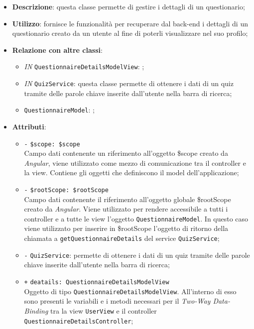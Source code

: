\begin{itemize}
	\item \textbf{Descrizione}: questa classe permette di gestire i dettagli di un questionario; 
	\item \textbf{Utilizzo}: fornisce le funzionalità per recuperare dal back-end i dettagli di un questionario creato da un utente al fine di poterli visualizzare nel suo profilo;
	\item \textbf{Relazione con altre classi}:
	\begin{itemize}
		\item \textit{IN} \texttt{QuestionnaireDetailsModelView}: ;
		\item \textit{IN} \texttt{QuizService}: questa classe permette di ottenere i dati di un quiz tramite delle parole chiave inserite dall'utente nella barra di ricerca;
		\item \textit{} \texttt{QuestionnaireModel}: ;
	\end{itemize}
	\item \textbf{Attributi}:
	\begin{itemize}
		\item \texttt{-} \texttt{\$scope: \$scope} \\
		Campo dati contenente un riferimento all’oggetto \$scope creato da \textit{Angular}, viene utilizzato come mezzo di comunicazione tra il controller e la view. Contiene gli oggetti che definiscono il model dell’applicazione;
		\item \texttt{-} \texttt{\$rootScope: \$rootScope} \\
		Campo dati contenente il riferimento all'oggetto globale \$rootScope creato da \textit{Angular}. Viene utilizzato per rendere accessibile a tutti i controller e a tutte le view l'oggetto \texttt{QuestionnaireModel}. In questo caso viene utilizzato per inserire in \$rootScope l'oggetto di ritorno della chiamata a \texttt{getQuestionnaireDetails} del service \texttt{QuizService};
		\item \texttt{-} \texttt{QuizService}: permette di ottenere i dati di un quiz tramite delle parole chiave inserite dall'utente nella barra di ricerca;
		\item \texttt{+} \texttt{deatails: QuestionnaireDetailsModelView} \\
		Oggetto di tipo \texttt{QuestionnaireDetailsModelView}. All'interno di esso sono presenti le variabili e i metodi necessari per il \textit{Two-Way Data-Binding} tra la view \texttt{UserView} e il controller \texttt{QuestionnaireDetailsController};

\end{itemize}
\end{itemize}
